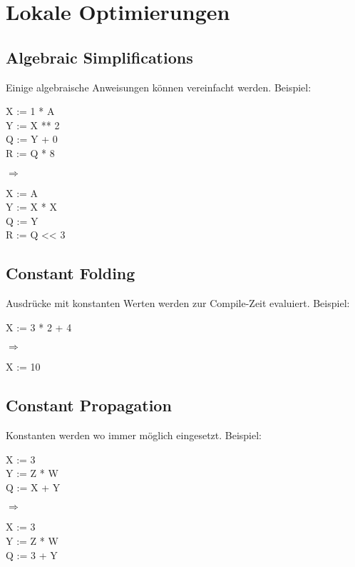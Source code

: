 \section{Lokale Optimierungen}

\subsection{Algebraic Simplifications}

Einige algebraische Anweisungen können vereinfacht werden. Beispiel:

\begin{varwidth}{\textwidth}\ttfamily
X := 1 * A\\
Y := X ** 2\\
Q := Y + 0\\
R := Q * 8
\end{varwidth}%
\hspace{1cm}$\Rightarrow$\hspace{1cm}%
\begin{varwidth}{\textwidth}\ttfamily
X := A\\
Y := X * X\\
Q := Y\\
R := Q << 3
\end{varwidth}

\subsection{Constant Folding}

Ausdrücke mit konstanten Werten werden zur Compile-Zeit evaluiert. Beispiel:

\begin{varwidth}{\textwidth}\ttfamily
X := 3 * 2 + 4
\end{varwidth}%
\hspace{1cm}$\Rightarrow$\hspace{1cm}%
\begin{varwidth}{\textwidth}\ttfamily
X := 10
\end{varwidth}

\subsection{Constant Propagation}

Konstanten werden wo immer möglich eingesetzt. Beispiel:

\begin{varwidth}{\textwidth}\ttfamily
X := 3\\
Y := Z * W\\
Q := X + Y
\end{varwidth}%
\hspace{1cm}$\Rightarrow$\hspace{1cm}%
\begin{varwidth}{\textwidth}\ttfamily
X := 3\\
Y := Z * W\\
Q := 3 + Y
\end{varwidth}

